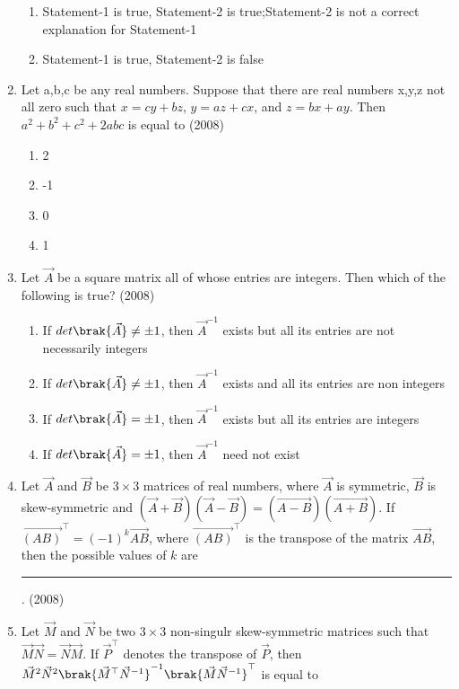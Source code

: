 \begin{enumerate}[label=\thesubsection.\arabic*.,ref=\thesubsection.\theenumi]
\begin{enumerate}
			\item Statement-1 is true, Statement-2 is true;Statement-2 is not a correct explanation for Statement-1
			\item Statement-1 is true, Statement-2 is false
		\end{enumerate}
	\item Let a,b,c be any real numbers. Suppose that there are real numbers x,y,z not all zero such that $x=cy+bz$, $y=az+cx$, and $z=bx+ay$. Then $a^2+b^2+c^2+2abc$ is equal to \hfill{(2008)}
\begin{multicols}{4}
		\begin{enumerate}
			\item 2
			\item -1
			\item 0
			\item 1
		\end{enumerate}
\end{multicols}
	\item Let $\vec{A}$ be a square matrix all of whose entries are integers. Then which of the following is true? \hfill{(2008)}
		\begin{enumerate}
			\item If $det\brak{\vec{A}}\neq\pm1$, then $\vec{A}^{-1}$ exists but all its entries are not necessarily integers
			\item If $det\brak{\vec{A}}\neq\pm1$, then $\vec{A}^{-1}$ exists and all its entries are non integers
			\item If $det\brak{\vec{A}}=\pm1$, then $\vec{A}^{-1}$ exists but all its entries are integers
			\item If $det\brak{\vec{A}}=\pm1$, then $\vec{A}^{-1}$ need not exist
		\end{enumerate}
		\item 
			Let $\vec{A}$ and $\vec{B}$ be $3\times3$ matrices of real numbers, where $\vec{A}$ is symmetric, $\vec{B}$ is skew-symmetric and $(\vec{A}+\vec{B})(\vec{A}-\vec{B})=(\vec{A-B})(\vec{A+B})$. If $\vec{(AB)}^\top=(-1)^k\vec{AB}$, where $\vec{(AB)}^\top$ is the transpose of the matrix $\vec{AB}$, then the possible values of $k$ are 
			\rule{1cm}{0.01pt}.
		\hfill(2008)
    \item 
        Let $\vec{M}$ and $\vec{N}$ be two $3 \times 3$ non-singulr skew-symmetric matrices such that $\vec{M}\vec{N}=\vec{N}\vec{M}$. If $\vec{P}^{\top}$ denotes the transpose of $\vec{P}$, then $\vec{M}^2\vec{N}^2\brak{\vec{M}^{\top}\vec{N}^{-1}}^{-1} \brak{\vec{M}\vec{N}^{-1}}^{\top}$ is equal to 
\begin{multicols}{4}

\end{multicols}
\end{enumerate}
